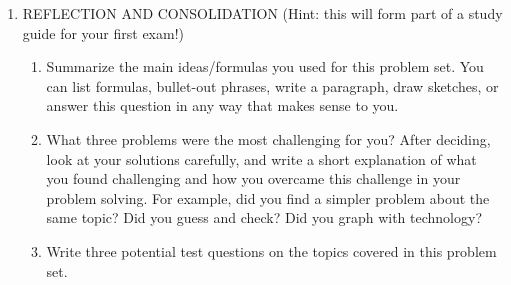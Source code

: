 \documentclass[12pt]{amsart}
\begin{document}
\begin{enumerate}
\item REFLECTION AND CONSOLIDATION (Hint: this will form part of a study guide for your first exam!)
\begin{enumerate}
\item Summarize the main ideas/formulas you used for this problem set.  You can list formulas, bullet-out phrases, write a paragraph, draw sketches, or answer this question in any way that makes sense to you.
\item What three problems were the most challenging for you?  After deciding, look at your solutions carefully, and write a short explanation of what you found challenging and how you overcame this challenge in your problem solving.  For example, did you find a simpler problem about the same topic?  Did you guess and check?  Did you graph with technology?
\item Write three potential test questions on the topics covered in this problem set.
\end{enumerate}


\end{enumerate}
\end{document}
